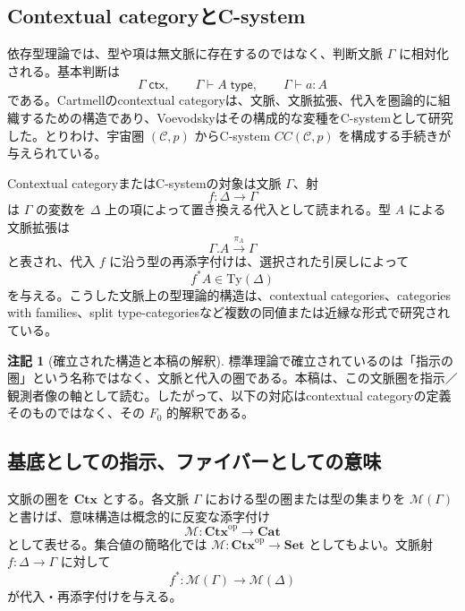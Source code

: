 \documentclass[a4paper,11pt]{ltjsarticle}
\theoremstyle{definition}
\newtheorem{remark}[definition]{注記}
\theoremstyle{plain}
\newcommand{\Obj}{\mathcal M}
\newcommand{\Set}{\mathbf{Set}}
\newcommand{\op}{\mathrm{op}}
\newcommand{\Ctx}{\mathbf{Ctx}}
\newcommand{\Ty}{\mathrm{Ty}}
\begin{document}
\subsection{Contextual categoryとC-system}

依存型理論では、型や項は無文脈に存在するのではなく、判断文脈 $\Gamma$ に相対化される。基本判断は
\begin{equation}
 \Gamma\;\mathsf{ctx},
 \qquad
 \Gamma\vdash A\;\mathsf{type},
 \qquad
 \Gamma\vdash a:A
 \label{eq:contextual-judgments}
\end{equation}
である。Cartmellのcontextual categoryは、文脈、文脈拡張、代入を圏論的に組織するための構造であり、Voevodskyはその構成的な変種をC-systemとして研究した。とりわけ、宇宙圏 $(\mathcal C,p)$ からC-system $CC(\mathcal C,p)$ を構成する手続きが与えられている\cite{Voevodsky2015CSystem}。

Contextual categoryまたはC-systemの対象は文脈 $\Gamma$、射
\begin{equation}
 f:\Delta\longrightarrow\Gamma
\end{equation}
は $\Gamma$ の変数を $\Delta$ 上の項によって置き換える代入として読まれる。型 $A$ による文脈拡張は
\begin{equation}
 \Gamma.A\xrightarrow{\pi_A}\Gamma
\end{equation}
と表され、代入 $f$ に沿う型の再添字付けは、選択された引戻しによって
\begin{equation}
 f^*A\in\Ty(\Delta)
\end{equation}
を与える。こうした文脈上の型理論的構造は、contextual categories、categories with families、split type-categoriesなど複数の同値または近縁な形式で研究されている\cite{AhrensLumsdaineVoevodsky2018}。

\begin{remark}[確立された構造と本稿の解釈]
標準理論で確立されているのは「指示の圏」という名称ではなく、文脈と代入の圏である。本稿は、この文脈圏を指示／観測者像の軸として読む。したがって、以下の対応はcontextual categoryの定義そのものではなく、その $F_0$ 的解釈である。
\end{remark}

\subsection{基底としての指示、ファイバーとしての意味}

文脈の圏を $\Ctx$ とする。各文脈 $\Gamma$ における型の圏または型の集まりを $\Obj(\Gamma)$ と書けば、意味構造は概念的に反変な添字付け
\begin{equation}
 \Obj:\Ctx^{\op}\longrightarrow\mathbf{Cat}
 \label{eq:indexed-meaning}
\end{equation}
として表せる。集合値の簡略化では $\Obj:\Ctx^{\op}\to\Set$ としてもよい。文脈射 $f:\Delta\to\Gamma$ に対して
\begin{equation}
 f^*:\Obj(\Gamma)\longrightarrow\Obj(\Delta)
\end{equation}
が代入・再添字付けを与える。
\end{document}
